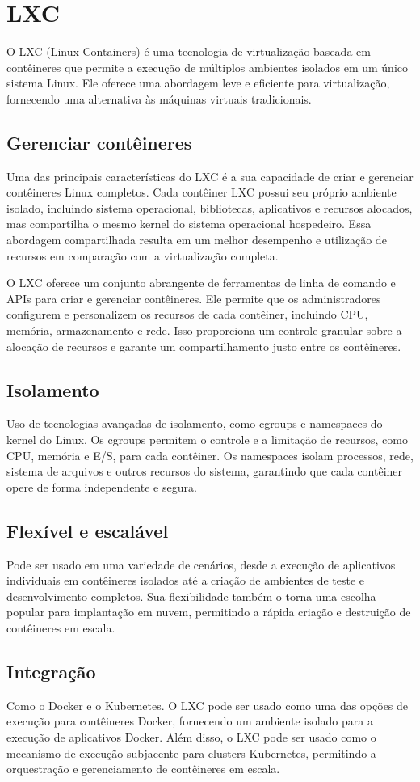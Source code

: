 \section{LXC}

O LXC (Linux Containers) é uma tecnologia de virtualização baseada em contêineres que permite a execução de múltiplos ambientes isolados em um único sistema Linux. Ele oferece uma abordagem leve e eficiente para virtualização, fornecendo uma alternativa às máquinas virtuais tradicionais.

\subsection{Gerenciar contêineres}
Uma das principais características do LXC é a sua capacidade de criar e gerenciar contêineres Linux completos. Cada contêiner LXC possui seu próprio ambiente isolado, incluindo sistema operacional, bibliotecas, aplicativos e recursos alocados, mas compartilha o mesmo kernel do sistema operacional hospedeiro. Essa abordagem compartilhada resulta em um melhor desempenho e utilização de recursos em comparação com a virtualização completa.

O LXC oferece um conjunto abrangente de ferramentas de linha de comando e APIs para criar e gerenciar contêineres. Ele permite que os administradores configurem e personalizem os recursos de cada contêiner, incluindo CPU, memória, armazenamento e rede. Isso proporciona um controle granular sobre a alocação de recursos e garante um compartilhamento justo entre os contêineres.

\subsection{Isolamento}
 Uso de tecnologias avançadas de isolamento, como cgroups e namespaces do kernel do Linux. Os cgroups permitem o controle e a limitação de recursos, como CPU, memória e E/S, para cada contêiner. Os namespaces isolam processos, rede, sistema de arquivos e outros recursos do sistema, garantindo que cada contêiner opere de forma independente e segura.

\subsection{Flexível e escalável}
 Pode ser usado em uma variedade de cenários, desde a execução de aplicativos individuais em contêineres isolados até a criação de ambientes de teste e desenvolvimento completos. Sua flexibilidade também o torna uma escolha popular para implantação em nuvem, permitindo a rápida criação e destruição de contêineres em escala.

\subsection{Integração}
  Como o Docker e o Kubernetes. O LXC pode ser usado como uma das opções de execução para contêineres Docker, fornecendo um ambiente isolado para a execução de aplicativos Docker. Além disso, o LXC pode ser usado como o mecanismo de execução subjacente para clusters Kubernetes, permitindo a orquestração e gerenciamento de contêineres em escala.